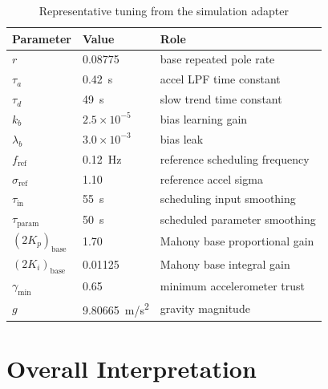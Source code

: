 \documentclass[conference]{IEEEtran}
\begin{document}
    \begin{table}[t]
        \centering
        \caption{Representative tuning from the simulation adapter}
        \label{tab:tuning}
        \small
        \begin{tabular}{@{}lll@{}}
            \toprule
            Parameter & Value & Role \\
            \midrule
            \(r\) & 0.08775 & base repeated pole rate \\
            \(\tau_a\) & \SI{0.42}{s} & accel LPF time constant \\
            \(\tau_d\) & \SI{49}{s} & slow trend time constant \\
            \(k_b\) & \(2.5\times10^{-5}\) & bias learning gain \\
            \(\lambda_b\) & \(3.0\times10^{-3}\) & bias leak \\
            \(f_{\mathrm{ref}}\) & \SI{0.12}{Hz} & reference scheduling frequency \\
            \(\sigma_{\mathrm{ref}}\) & 1.10 & reference accel sigma \\
            \(\tau_{\mathrm{in}}\) & \SI{55}{s} & scheduling input smoothing \\
            \(\tau_{\mathrm{param}}\) & \SI{50}{s} & scheduled parameter smoothing \\
            \((2K_p)_{\mathrm{base}}\) & 1.70 & Mahony base proportional gain \\
            \((2K_i)_{\mathrm{base}}\) & 0.01125 & Mahony base integral gain \\
            \(\gamma_{\min}\) & 0.65 & minimum accelerometer trust \\
            \(g\) & \SI{9.80665}{m/s^2} & gravity magnitude \\
            \bottomrule
        \end{tabular}
    \end{table}

    \section{Overall Interpretation}
\end{document}
